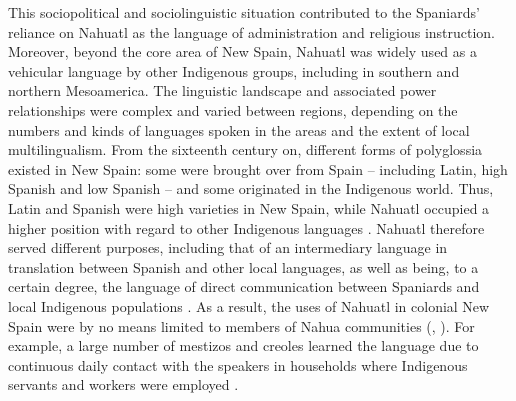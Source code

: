 \documentclass[output=paper,hidelinks]{langscibook}
\begin{document}
This sociopolitical and sociolinguistic situation contributed to the Spaniards’ reliance on Nahuatl as the language of administration and religious instruction. Moreover, beyond the core area of New Spain, Nahuatl was widely used as a vehicular language by other Indigenous groups, including in southern and northern Mesoamerica. The linguistic landscape and associated power relationships were complex and varied between regions, depending on the numbers and kinds of languages spoken in the areas and the extent of local multilingualism. From the sixteenth century on, different forms of polyglossia existed in New Spain: some were brought over from Spain – including Latin, high Spanish and low Spanish – and some originated in the Indigenous world. Thus, Latin and Spanish were high varieties in New Spain, while Nahuatl occupied a higher position with regard to other Indigenous languages \citep[308--310]{parodi2010}. Nahuatl therefore served different purposes, including that of an intermediary language in translation between Spanish and other local languages, as well as being, to a certain degree, the language of direct communication between Spaniards and local Indigenous populations \citep{nesvig2012, schwaller2012}. As a result, the uses of Nahuatl in colonial New Spain were by no means limited to members of Nahua communities (\citealt[669--670]{yannanakis2012}, \citealt[739--758]{nesvig2012}). For example, a large number of mestizos and creoles learned the language due to continuous daily contact with the speakers in households where Indigenous servants and workers were employed \citep[334]{parodi2010}.
\newpage
\end{document}
